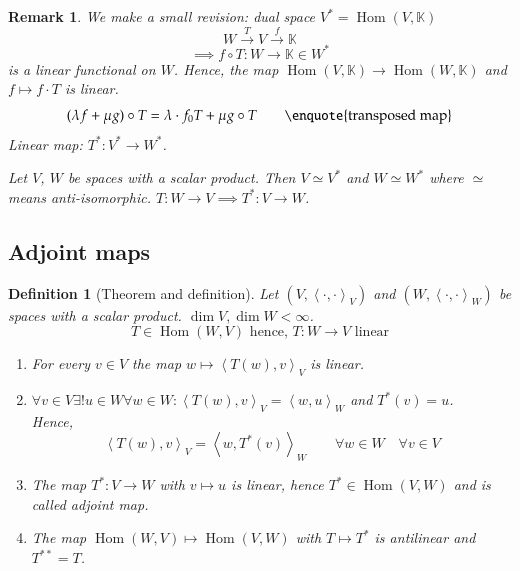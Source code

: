 \documentclass[a4paper]{article}
\newcounter{lecref}[section]
\numberwithin{lecref}{section}
\newtheorem{definition}[lecref]{Definition}
\newtheorem*{Remark}{Remark}
\newcommand{\ip}[2]{\left\langle#1,#2\right\rangle} %
\begin{document}
\begin{Remark}
  We make a small revision: dual space $V^* = \operatorname{Hom}(V, \mathbb K)$
  \[ W \xrightarrow{T} V \xrightarrow{f} \mathbb K \]
  \[ \implies f \circ T: W \to \mathbb K \in W^* \]
  is a linear functional on $W$.
  Hence, the map $\operatorname{Hom}(V, \mathbb K) \to \operatorname{Hom}(W, \mathbb K)$ and $f \mapsto f \cdot T$ is linear.
  \[ (\lambda f + \mu g) \circ T = \lambda \cdot f_0 T + \mu g \circ T \qquad \text{\enquote{transposed map}} \]
  Linear map: $T^*: V^* \to W^*$.

  Let $V$, $W$ be spaces with a scalar product. Then $V \simeq V^*$ and $W \simeq W^*$ where $\simeq$ means anti-isomorphic.
  $T: W \to V \implies T^*: V \to W$.
\end{Remark}

\subsection{Adjoint maps}
\begin{definition}[Theorem and definition] %
  \label{def863}
  Let $(V, \ip{\cdot}{\cdot}_V)$ and $(W, \ip{\cdot}{\cdot}_W)$ be spaces with a scalar product. $\dim{V}, \dim{W} < \infty$.
  \[ T \in \operatorname{Hom}(W, V) \text{ hence, } T: W \to V \text{ linear} \]
  \begin{enumerate}
    \item For every $v \in V$ the map $w \mapsto \ip{T(w)}{v}_V$ is linear.
    \item $\forall v \in V \exists! u \in W \forall w \in W: \ip{T(w)}{v}_V = \ip{w}{u}_W$ and $T^*(v) = u$. \\
      Hence,
      \[ \ip{T(w)}{v}_V = \ip{w}{T^*(v)}_W \qquad \forall w \in W \quad \forall v \in V \]
    \item The map $T^*: V \to W$ with $v \mapsto u$ is linear, hence $T^* \in \operatorname{Hom}(V, W)$ and is called \emph{adjoint map}.
    \item The map $\operatorname{Hom}(W, V) \mapsto \operatorname{Hom}(V, W)$ with $T \mapsto T^*$ is antilinear and $T^{**} = T$.
  \end{enumerate}
\end{definition}
\end{document}
